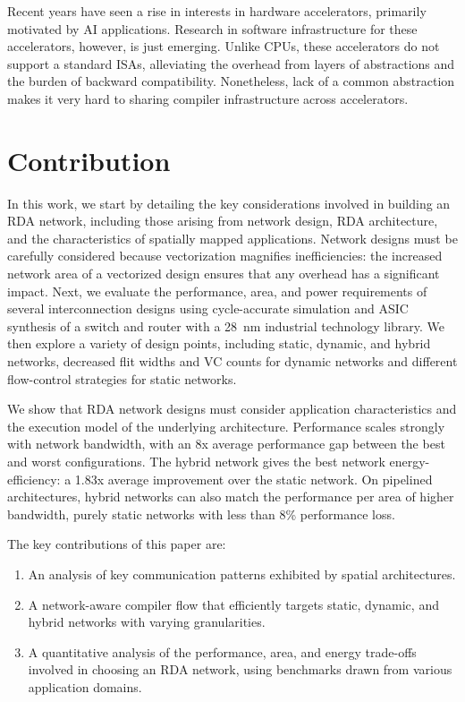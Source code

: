 Recent years have seen a rise in interests in hardware accelerators, primarily motivated by AI applications. 
Research in software infrastructure for these accelerators, however, is just emerging.
Unlike CPUs, these accelerators do not support a standard ISAs, alleviating the overhead from
layers of abstractions and the burden of backward compatibility. 
Nonetheless, lack of a common abstraction makes it very hard to sharing compiler infrastructure
across accelerators. 

\section{Contribution}

In this work, we start by detailing the key considerations involved in building an RDA network, including those arising from network design, RDA architecture, and the characteristics of spatially mapped applications.
Network designs must be carefully considered because vectorization magnifies inefficiencies: the increased network area of a vectorized design ensures that any overhead has a significant impact.
Next, we evaluate the performance, area, and power requirements of several interconnection designs using cycle-accurate simulation and ASIC synthesis of a switch and router with a \SI{28}{nm} industrial technology library.
We then explore a variety of design points, including static, dynamic, and hybrid networks, decreased flit widths and VC counts for dynamic networks and different flow-control strategies for static networks.

We show that RDA network designs must consider application characteristics and the execution model of the underlying architecture.
Performance scales strongly with network bandwidth, with an 8x average performance gap between the best and worst configurations. 
The hybrid network gives the best network energy-efficiency: a 1.83x average improvement over the static network. On pipelined architectures,
hybrid networks can also match the performance per area of higher bandwidth, purely static networks with less than 8\% performance loss.

The key contributions of this paper are:
\begin{enumerate}
    \item An analysis of key communication patterns exhibited by spatial architectures.
    \item A network-aware compiler flow that efficiently targets static, dynamic, and hybrid networks with varying granularities.
    \item A quantitative analysis of the performance, area, and energy trade-offs involved in choosing an RDA network, using benchmarks drawn from various application domains.
\end{enumerate}

